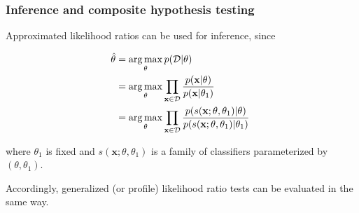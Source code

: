 \documentclass{beamer}
\DeclareMathOperator*{\argmax}{arg\,max}
\begin{document}
\begin{frame}
    \frametitle{Inference and composite hypothesis testing}

    Approximated likelihood ratios can be used for inference, since

    {\small
    \begin{align}\label{eqn:mle}
        \hat{\theta} &= \argmax_\theta  p({\cal D} | \theta) \nonumber \\
                     &= \argmax_\theta  \prod_{\mathbf{x} \in {\cal D}} \frac{p(\mathbf{x}| \theta)}{p(\mathbf{x}|\theta_1)} \nonumber \\
                     &= \argmax_\theta  \prod_{\mathbf{x} \in {\cal D}} \frac{p(s(\mathbf{x}; \theta, \theta_1) | \theta)}{p(s(\mathbf{x}; \theta, \theta_1) |\theta_1)} \;
    \end{align}}

    where $\theta_1$ is fixed and $s(\mathbf{x}; \theta, \theta_1)$ is a family of classifiers parameterized by $(\theta, \theta_1)$.

    \vspace{1em}

    Accordingly, generalized (or profile) likelihood ratio tests can be evaluated in the same way.
\end{frame}
\end{document}
